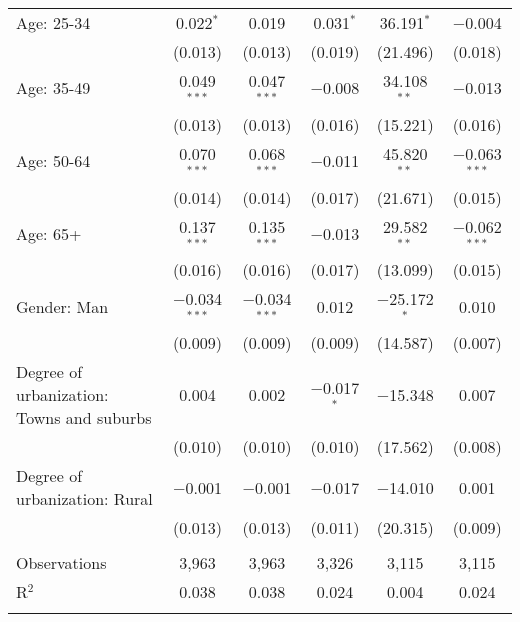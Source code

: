 \begin{tabular}{@{\extracolsep{5pt}}lccccc}
  Age: 25-34 & 0.022$^{*}$ & 0.019 & 0.031$^{*}$ & 36.191$^{*}$ & $-$0.004 \\ 
  & (0.013) & (0.013) & (0.019) & (21.496) & (0.018) \\ 
  Age: 35-49 & 0.049$^{***}$ & 0.047$^{***}$ & $-$0.008 & 34.108$^{**}$ & $-$0.013 \\ 
  & (0.013) & (0.013) & (0.016) & (15.221) & (0.016) \\ 
  Age: 50-64 & 0.070$^{***}$ & 0.068$^{***}$ & $-$0.011 & 45.820$^{**}$ & $-$0.063$^{***}$ \\ 
  & (0.014) & (0.014) & (0.017) & (21.671) & (0.015) \\ 
  Age: 65+ & 0.137$^{***}$ & 0.135$^{***}$ & $-$0.013 & 29.582$^{**}$ & $-$0.062$^{***}$ \\ 
  & (0.016) & (0.016) & (0.017) & (13.099) & (0.015) \\ 
  Gender: Man & $-$0.034$^{***}$ & $-$0.034$^{***}$ & 0.012 & $-$25.172$^{*}$ & 0.010 \\ 
  & (0.009) & (0.009) & (0.009) & (14.587) & (0.007) \\ 
  Degree of urbanization: Towns and suburbs & 0.004 & 0.002 & $-$0.017$^{*}$ & $-$15.348 & 0.007 \\ 
  & (0.010) & (0.010) & (0.010) & (17.562) & (0.008) \\ 
  Degree of urbanization: Rural & $-$0.001 & $-$0.001 & $-$0.017 & $-$14.010 & 0.001 \\ 
  & (0.013) & (0.013) & (0.011) & (20.315) & (0.009) \\ 
 \hline \\[-1.8ex] 

Observations & 3,963 & 3,963 & 3,326 & 3,115 & 3,115 \\ 
R$^{2}$ & 0.038 & 0.038 & 0.024 & 0.004 & 0.024 \\ 
\hline 
\hline \\[-1.8ex] 
\end{tabular} 